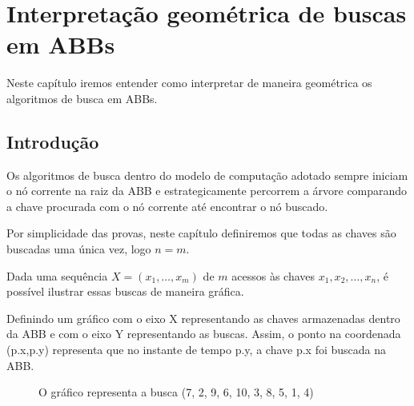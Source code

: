 
\chapter{Interpretação geométrica de buscas em ABBs}
\label{cap:geometria}

Neste capítulo iremos entender como interpretar de maneira geométrica os algoritmos de busca em ABBs.

\section{Introdução}

Os algoritmos de busca dentro do modelo de computação adotado sempre iniciam o nó corrente na raiz da ABB e estrategicamente percorrem a árvore comparando a chave procurada com o nó corrente até encontrar o nó buscado.

Por simplicidade das provas, neste capítulo definiremos que todas as chaves são buscadas uma única vez, logo $n = m$.

Dada uma sequência $X = (x_{1},\ldots,x_{m})$ de $m$ acessos às chaves $x_{1}, x_{2},\ldots,x_{n}$, é possível ilustrar essas buscas de maneira gráfica.

Definindo um gráfico com o eixo X representando as chaves armazenadas dentro da ABB e com o eixo Y representando as buscas. Assim, o ponto na coordenada (p.x,p.y) representa que no instante de tempo p.y, a chave p.x foi buscada na ABB.

\begin{figure}
    \centering    
    \caption{O gráfico representa a busca (7, 2, 9, 6, 10, 3, 8, 5, 1, 4)}
    \label{grafico2D-exemplo-inicial}
\end{figure}


